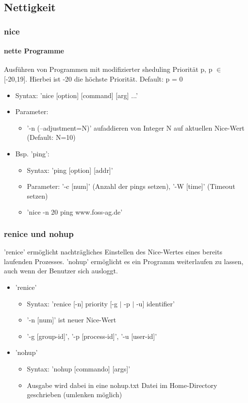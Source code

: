 \documentclass[12pt,utf8, handout]{beamer}
\begin{document}
\subsection{Nettigkeit}
\begin{frame}
\frametitle{nice}
\framesubtitle{nette Programme}
Ausführen von Programmen mit modifizierter sheduling Priorität p, p $\in$ [-20,19]. Hierbei ist -20 die höchste Priorität. Default: p = 0
\begin{itemize}[<+->]
	\item Syntax: 'nice [option] [command] [arg] ...'
	\item Parameter:
	\begin{itemize}
		\item '-n (--adjustment=N)' aufaddieren von Integer N auf aktuellen Nice-Wert (Default: N=10)
	\end{itemize}
	\item Bsp. 'ping':
	\begin{itemize}[<+->]
		\item Syntax: 'ping [option] [addr]'
		\item Parameter: {\scriptsize '-c [num]' (Anzahl der pings setzen), '-W [time]' (Timeout setzen)}
		\item 'nice -n 20 ping www.foss-ag.de'
	\end{itemize}
\end{itemize}
\end{frame}

\begin{frame}
\frametitle{renice und nohup}
'renice' ermöglicht nachträgliches Einstellen des Nice-Wertes eines bereits laufenden Prozesses.
'nohup' ermöglicht es ein Programm weiterlaufen zu lassen, auch wenn der Benutzer sich ausloggt.
\begin{itemize}
	\item 'renice'
	\begin{itemize}[<+->]
		\item Syntax: 'renice [-n] priority [-g $\mid$ -p $\mid$ -u] identifier'
		\item '-n [num]' ist neuer Nice-Wert
		\item '-g [group-id]', '-p [process-id]', '-u [user-id]'
	\end{itemize}
	\item 'nohup'
	\begin{itemize}
		\item Syntax: 'nohup [commando] [args]'
		\item Ausgabe wird dabei in eine nohup.txt Datei im Home-Directory geschrieben (umlenken möglich)
	\end{itemize}
\end{itemize}
\end{frame}
\end{document}
